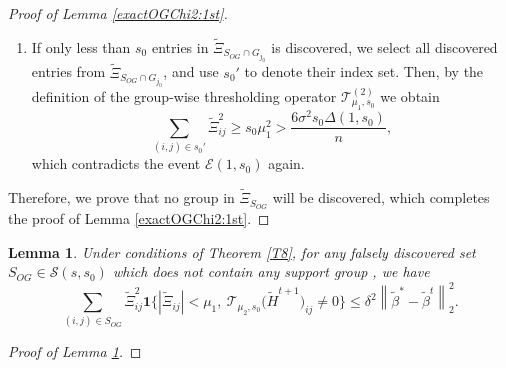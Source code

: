 \documentclass[12pt]{article}
\newtheorem{lemma}{Lemma}
\newtheorem{proof}{Proof}
\begin{document}
\begin{appendix}
\begin{proof}[Proof of Lemma \ref{exactOGChi2:1st}]
\begin{enumerate}
        \item If only less than $s_0$ entries in $\tilde \Xi_{S_{OG}\cap G_{j_0}}$ is discovered, we select all discovered entries from $\tilde \Xi_{S_{OG}\cap G_{j_0}}$, and use $s_0'$ to denote their index set.
        Then, by the definition of the group-wise thresholding operator $\mathcal T_{\mu_{1},s_0}^{(2)}$ we obtain
        \begin{equation*} 
        \sum_{(i,j) \in s_0'} \tilde \Xi_{ij}^2  
        \ge  s_0 \mu_1^2 
        >\frac{6\sigma^2 s_0 \Delta(1,s_0)}{n},
        \end{equation*}
        which contradicts the event $\mathcal E(1,s_0)$ again.
    \end{enumerate}

    Therefore, we prove that no group in $\tilde \Xi_{S_{OG}}$ will be discovered, which completes the proof of Lemma \ref{exactOGChi2:1st}.
\end{proof}

\begin{lemma}\label{OGChi2:2nd}
    Under conditions of Theorem \ref{T8}, for any falsely discovered set $S_{OG} \in \mathcal S(s,s_0)$ which does not contain any support group
    , we have 
\begin{equation}\label{eq:exactOGChi2:2nd}
\sum_{(i,j) \in S_{OG}} \tilde \Xi_{ij}^2\mathbf1\Big\{| \tilde\Xi_{ij}|< \mu_1,
     ~ \mathcal T_{\mu_{2},s_0} \big(\tilde H^{t+1}\big)_{ij}\ne 0\Big\}
\le \delta^2 \left\|  \tilde \beta^* -\tilde \beta^t \right\|_2^2.
\end{equation} 
\end{lemma}

\begin{proof}[Proof of Lemma \ref{OGChi2:2nd}]
    

\end{proof}
\end{appendix}
\end{document}

